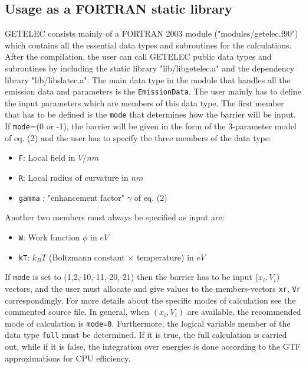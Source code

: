 \documentclass[notitlepage
]{revtex4-1}
\begin{document}
\subsection{Usage as a FORTRAN static library}   
\label{fortran}
GETELEC consists mainly of a FORTRAN 2003 module ("modules/getelec.f90") which contains all the essential data types and subroutines for the calculations. After the compilation, the user can call GETELEC public data types and subroutines by including the static library "lib/libgetelec.a" and the dependency library "lib/libslatec.a". The main data type in the module that handles all the emission data and parameters is the \texttt{EmissionData}. The user mainly has to define the input parameters which are members of this data type. The first member that has to be defined is the \texttt{mode} that determines how the barrier will be input. If \texttt{mode}=(0 or -1), the barrier will be given in the form of the 3-parameter model of eq. (2) and the user has to specify the three members of the data type:
\begin{itemize}
	\item \texttt{F}: Local field in $V/nm$
	\item \texttt{R}: Local radius of curvature in $nm$
	\item \texttt{gamma} : "enhancement factor" $\gamma$ of eq. (2) 
\end{itemize} 
Another two members must always be specified as input are:
\begin{itemize}
	\item \texttt{W}: Work function $\phi$ in $eV$
	\item \texttt{kT}: $k_BT$ (Boltzmann constant $\times$ temperature) in $eV$
\end{itemize}
If \texttt{mode} is set to (1,2,-10,-11,-20,-21) then the barrier has to be input ($x_i,V_i$) vectors, and the user must allocate and give values to the members-vectors \texttt{xr}, \texttt{Vr} correspondingly. For more details about the specific modes of calculation see the commented source file. In general, when $(x_i,V_i)$ are available, the recommended mode of calculation is \texttt{mode=0}. Furthermore, the logical variable member of the data type \texttt{full} must be determined. If it is true, the full calculation is carried out, while if it is false, the integration over energies is done according to the GTF approximations for CPU efficiency.
\end{document}
